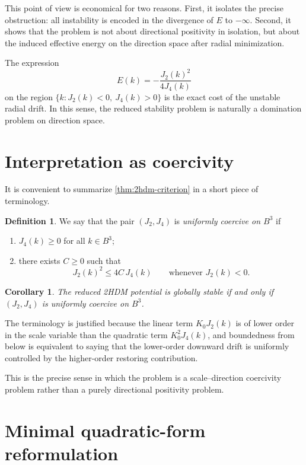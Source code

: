 \documentclass[11pt,a4paper]{article}
\newtheorem{corollary}[theorem]{Corollary}
\theoremstyle{definition}
\newtheorem{definition}[theorem]{Definition}
\theoremstyle{remark}
\begin{document}
This point of view is economical for two reasons. First, it isolates the precise obstruction: all instability is encoded in the divergence of $E$ to $-\infty$. Second, it shows that the problem is not about directional positivity in isolation, but about the induced effective energy on the direction space after radial minimization.

The expression
\[
E(k)=-\frac{J_2(k)^2}{4J_4(k)}
\]
on the region $\{k:J_2(k)<0,\ J_4(k)>0\}$ is the exact cost of the unstable radial drift. In this sense, the reduced stability problem is naturally a domination problem on direction space.

\section{Interpretation as coercivity}

It is convenient to summarize \cref{thm:2hdm-criterion} in a short piece of terminology.

\begin{definition}\label{def:uniform-coercivity}
We say that the pair $(J_2,J_4)$ is \emph{uniformly coercive on $B^3$} if
\begin{enumerate}[label=(\arabic*)]
  \item $J_4(k)\ge0$ for all $k\in B^3$;
  \item there exists $C\ge0$ such that
  \[
  J_2(k)^2\le 4C\,J_4(k)
  \qquad\text{whenever }J_2(k)<0.
  \]
\end{enumerate}
\end{definition}

\begin{corollary}\label{cor:coercivity-reformulation}
The reduced 2HDM potential is globally stable if and only if $(J_2,J_4)$ is uniformly coercive on $B^3$.
\end{corollary}

The terminology is justified because the linear term $K_0J_2(k)$ is of lower order in the scale variable than the quadratic term $K_0^2J_4(k)$, and boundedness from below is equivalent to saying that the lower-order downward drift is uniformly controlled by the higher-order restoring contribution.

This is the precise sense in which the problem is a scale--direction coercivity problem rather than a purely directional positivity problem.

\section{Minimal quadratic-form reformulation}
\end{document}
